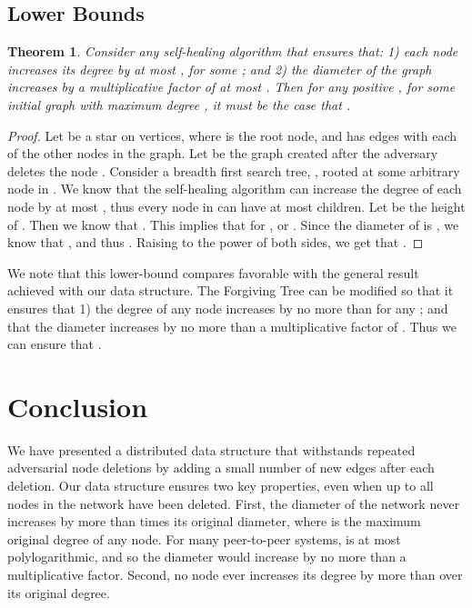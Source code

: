 \documentclass[11pt]{article}
\newtheorem{theorem}{Theorem}
\begin{document}
\subsection{Lower Bounds}
\label{subsec: lowerbounds}

\begin{theorem}
Consider any self-healing algorithm that ensures that: 1) each node
increases its degree by at most , for some ;
and 2) the diameter of the graph increases by a multiplicative factor
of at most .  Then for any positive , for some initial
graph with maximum degree , it must be the case that
.
\end{theorem}

\begin{proof}
Let  be a star on  vertices, where  is the root
node, and  has  edges with each of the other nodes in the
graph.  Let  be the graph created after the adversary deletes the
node .  Consider a breadth first search tree, , rooted at some
arbitrary node  in .  We know that the self-healing algorithm
can increase the degree of each node by at most , thus every
node in  can have at most  children.  Let  be the
height of .  Then we know that .  This implies that 
for , or .  Since the
diameter of  is , we know that , and thus .  Raising  to the power of both
sides, we get that .
\end{proof}

\medskip
\noindent
We note that this lower-bound compares favorable with the general
result achieved with our data structure.  The Forgiving Tree can be
modified so that it ensures that 1) the degree of any node increases
by no more than  for any ; and that the
diameter increases by no more than a multiplicative factor of .  Thus we can ensure that
.
 


\section{Conclusion}

We have presented a distributed data structure that withstands
repeated adversarial node deletions by adding a small number of new
edges after each deletion.  Our data structure ensures two key
properties, even when up to all nodes in the network have been
deleted.  First, the diameter of the network never increases by more
than  times its original diameter, where  is
the maximum original degree of any node.  For many peer-to-peer
systems,  is at most polylogarithmic, and so the diameter
would increase by no more than a  multiplicative
factor.  Second, no node ever increases its degree by more than 
over its original degree.
\end{document}
